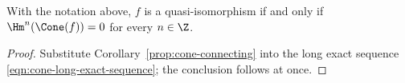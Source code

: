 \begin{corollary}\label{prop:quism-cone}
	With the notation above, $f$ is a quasi-isomorphism if and only if
	$\Hm^n(\Cone(f))=0$ for every $n\in\Z$.
\end{corollary}

\begin{proof}
	Substitute Corollary~\ref{prop:cone-connecting} into the long exact
	sequence \eqref{eqn:cone-long-exact-sequence}; the conclusion follows at
	once.
\end{proof}

